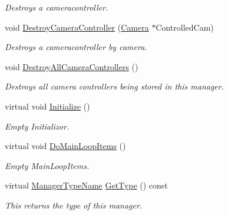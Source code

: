 \begin{DoxyCompactItemize}
\begin{DoxyCompactList}\small\item\em Destroys a cameracontroller. \item\end{DoxyCompactList}\item 
void \hyperlink{classphys_1_1CameraManager_abe794b8f60532d6ac188ed94d00d1c00}{DestroyCameraController} (\hyperlink{classphys_1_1Camera}{Camera} $\ast$ControlledCam)
\begin{DoxyCompactList}\small\item\em Destroys a cameracontroller by camera. \item\end{DoxyCompactList}\item 
\hypertarget{classphys_1_1CameraManager_a4ef5eda014de8f0f4fc866cd6574be96}{
void \hyperlink{classphys_1_1CameraManager_a4ef5eda014de8f0f4fc866cd6574be96}{DestroyAllCameraControllers} ()}
\label{d9/d91/classphys_1_1CameraManager_a4ef5eda014de8f0f4fc866cd6574be96}

\begin{DoxyCompactList}\small\item\em Destroys all camera controllers being stored in this manager. \item\end{DoxyCompactList}\item 
virtual void \hyperlink{classphys_1_1CameraManager_a5e956b61fa341ae576d8d160da518488}{Initialize} ()
\begin{DoxyCompactList}\small\item\em Empty Initializor. \item\end{DoxyCompactList}\item 
virtual void \hyperlink{classphys_1_1CameraManager_aaae22266bccc43f6efa66d2735d7d1d3}{DoMainLoopItems} ()
\begin{DoxyCompactList}\small\item\em Empty MainLoopItems. \item\end{DoxyCompactList}\item 
virtual \hyperlink{classphys_1_1ManagerBase_aaa6ccddf23892eaccb898529414f80a5}{ManagerTypeName} \hyperlink{classphys_1_1CameraManager_a8412ea634307aa280b615a3cc7c9b739}{GetType} () const 
\begin{DoxyCompactList}\small\item\em This returns the type of this manager. \item\end{DoxyCompactList}\end{DoxyCompactItemize}

